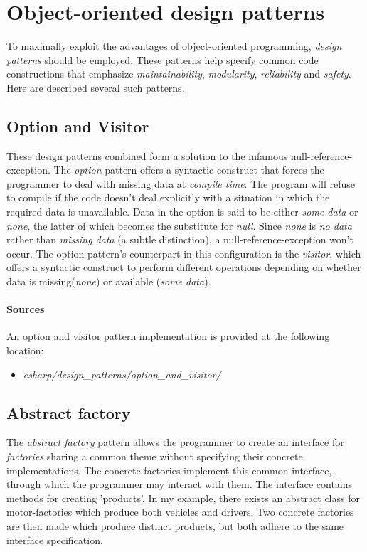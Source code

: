 \documentclass{article}
\begin{document}
{%
\newpage


\section{Object-oriented design patterns}
To maximally exploit the advantages of object-oriented programming, {\em design patterns} should be employed. These patterns
help specify common code constructions that emphasize {\em maintainability}, {\em modularity}, {\em reliability} and
{\em safety}. Here are described several such patterns.

\subsection{Option and Visitor}
These design patterns combined form a solution to the infamous null-reference-exception. The {\em option} pattern offers a
syntactic construct that forces the programmer to deal with missing data at {\em compile time}. The program will refuse to
compile if the code doesn't deal explicitly with a situation in which the required data is unavailable. Data in the option
is said to be either {\em some data} or {\em none}, the latter of which becomes the substitute for {\em null}. Since {\em none}
is {\em no data} rather than {\em missing data} (a subtle distinction), a null-reference-exception won't occur. The option
pattern's counterpart in this configuration is the {\em visitor}, which offers a syntactic construct to perform different
operations depending on whether data is missing({\em none}) or available ({\em some data}).

\begin{samepage}
  \paragraph{Sources}
  An option and visitor pattern implementation is provided at the following location:
  \begin{itemize}
  \item{{\em csharp/design\_patterns/option\_and\_visitor/}}
  \end{itemize}
\end{samepage}


\subsection{Abstract factory}
The {\em abstract factory} pattern allows the programmer to create an interface for {\em factories} sharing a common
theme without specifying their concrete implementations. The concrete factories implement this common interface, through
which the programmer may interact with them. The interface contains methods for creating 'products'. In my example, there
exists an abstract class for motor-factories which produce both vehicles and drivers. Two concrete factories are then
made which produce distinct products, but both adhere to the same interface specification.

}
\end{document}
